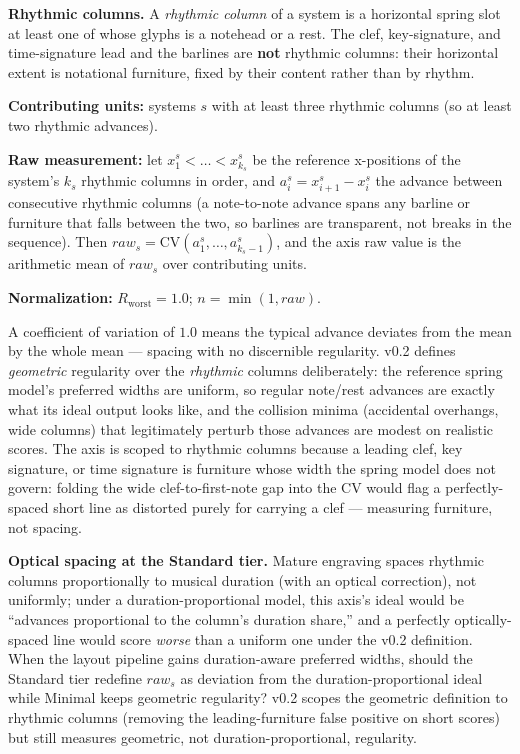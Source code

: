 \documentclass[11pt,letterpaper]{report}
\newcounter{requirement}[chapter]
\begin{document}
\begin{requirement}
\label{req:qmc:spacing}
\textbf{Rhythmic columns.} A \emph{rhythmic column} of a system is a
horizontal spring slot at least one of whose glyphs is a notehead or a
rest. The clef, key-signature, and time-signature lead and the barlines are
\textbf{not} rhythmic columns: their horizontal extent is notational
furniture, fixed by their content rather than by rhythm.

\textbf{Contributing units:} systems $s$ with at least three rhythmic
columns (so at least two rhythmic advances).

\textbf{Raw measurement:} let $x^s_1 < \dots < x^s_{k_s}$ be the reference
x-positions of the system's $k_s$ rhythmic columns in order, and
$a^s_i = x^s_{i+1} - x^s_i$ the advance between consecutive rhythmic columns
(a note-to-note advance spans any barline or furniture that falls between
the two, so barlines are transparent, not breaks in the sequence). Then
$\mathit{raw}_s = \mathrm{CV}(a^s_1, \dots, a^s_{k_s - 1})$, and the axis
raw value is the arithmetic mean of $\mathit{raw}_s$ over contributing
units.

\textbf{Normalization:} $R_{\mathrm{worst}} = 1.0$;
$n = \min(1, \mathit{raw})$.
\end{requirement}

\begin{rationale}
A coefficient of variation of $1.0$ means the typical advance deviates from
the mean by the whole mean --- spacing with no discernible regularity. v0.2
defines \emph{geometric} regularity over the \emph{rhythmic} columns
deliberately: the reference spring model's preferred widths are uniform, so
regular note/rest advances are exactly what its ideal output looks like,
and the collision minima (accidental overhangs, wide columns) that
legitimately perturb those advances are modest on realistic scores. The
axis is scoped to rhythmic columns because a leading clef, key signature,
or time signature is furniture whose width the spring model does not govern:
folding the wide clef-to-first-note gap into the CV would flag a
perfectly-spaced short line as distorted purely for carrying a clef ---
measuring furniture, not spacing.
\end{rationale}

\begin{openquestion}
\textbf{Optical spacing at the Standard tier.} Mature engraving spaces
rhythmic columns proportionally to musical duration (with an optical
correction), not uniformly; under a duration-proportional model, this
axis's ideal would be ``advances proportional to the column's duration
share,'' and a perfectly optically-spaced line would score \emph{worse}
than a uniform one under the v0.2 definition. When the layout pipeline
gains duration-aware preferred widths, should the Standard tier redefine
$\mathit{raw}_s$ as deviation from the duration-proportional ideal while
Minimal keeps geometric regularity? v0.2 scopes the geometric definition to
rhythmic columns (removing the leading-furniture false positive on short
scores) but still measures geometric, not duration-proportional, regularity.
\end{openquestion}
\end{document}
